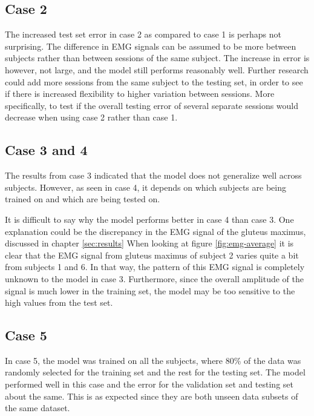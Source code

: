 \documentclass[../main.tex]{subfiles}
\begin{document}
\subsection{Case 2}
\label{sec:discussion-case2}
The increased test set error in case 2 as compared to case 1 is perhaps not surprising. 
The difference in \ac{EMG} signals can be assumed to be more between subjects rather than between sessions of the same subject.
The increase in error is however, not large, and the model still performs reasonably well.
Further research could add more sessions from the same subject to the testing set, in order to see if there is increased flexibility to higher variation between sessions.
More specifically, to test if the overall testing error of several separate sessions would decrease when using case 2 rather than case 1.

\subsection{Case 3 and 4}
\label{sec:discussion-case3and4}
The results from case 3 indicated that the model does not generalize well across subjects.
However, as seen in case 4, it depends on which subjects are being trained on and which are being tested on.

It is difficult to say why the model performs better in case 4 than case 3.
One explanation could be the discrepancy in the \ac{EMG} signal of the gluteus maximus, discussed in chapter \ref{sec:results}
When looking at figure \ref{fig:emg-average} it is clear that the \ac{EMG} signal from gluteus maximus of subject 2 varies quite a bit from subjects 1 and 6.
In that way, the pattern of this \ac{EMG} signal is completely unknown to the model in case 3.
Furthermore, since the overall amplitude of the signal is much lower in the training set, the model may be too sensitive to the high values from the test set.

\subsection{Case 5}
\label{sec:discussion-case5}
In case 5, the model was trained on all the subjects, where 80\% of the data was randomly selected for the training set and the rest for the testing set.
The model performed well in this case and the error for the validation set and testing set about the same.
This is as expected since they are both unseen data subsets of the same dataset.
\end{document}
